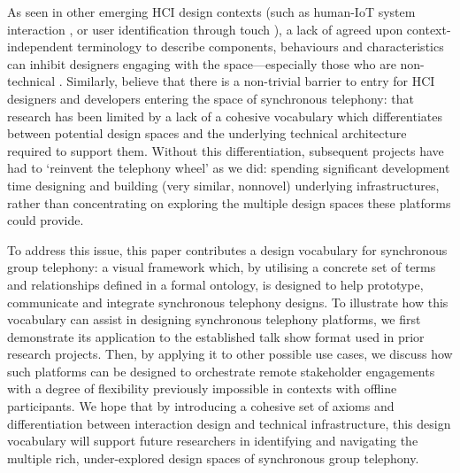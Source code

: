 As seen in other emerging HCI design contexts (such as human-IoT system interaction \cite{Chuang2018}, or user identification through touch \cite{Kharrufa2017}), a lack of agreed upon context-independent terminology to describe components, behaviours and characteristics can inhibit designers engaging with the space---especially those who are non-technical \cite{Kharrufa2017}. Similarly, believe that there is a non-trivial barrier to entry for HCI designers and developers entering the space of synchronous telephony: that research has been limited by a lack of a cohesive vocabulary which differentiates between potential design spaces and the underlying technical architecture required to support them. Without this differentiation, subsequent projects have had to `reinvent the telephony wheel' as we did: spending significant development time designing and building (very similar, nonnovel) underlying infrastructures, rather than concentrating on exploring the multiple design spaces these platforms could provide. 

To address this issue, this paper contributes a design vocabulary for synchronous group telephony: a visual framework which, by utilising a concrete set of terms and relationships defined in a formal ontology, is designed to help prototype, communicate and integrate synchronous telephony designs. To illustrate how this vocabulary can assist in designing synchronous telephony platforms, we first demonstrate its application to the established talk show format used in prior research projects. Then, by applying it to other possible use cases, we discuss how such platforms can be designed to orchestrate remote stakeholder engagements with a degree of flexibility previously impossible in contexts with offline participants. We hope that by introducing a cohesive set of axioms and differentiation between interaction design and technical infrastructure, this design vocabulary will support future researchers in identifying and navigating the multiple rich, under-explored design spaces of synchronous group telephony.